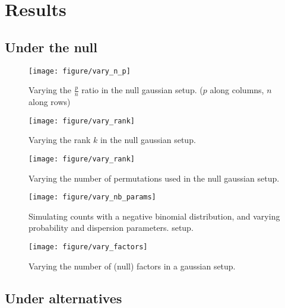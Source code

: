 \documentclass{article}
\begin{document}
\section{Results}

\subsection{Under the null}

\begin{figure}[ht]
  \centering
  \texttt{[image: figure/vary\_n\_p]}
  \caption{Varying the $\frac{p}{n}$ ratio in the null gaussian
    setup. ($p$ along columns, $n$ along rows)\label{fig:label} }
\end{figure}

\begin{figure}[ht]
  \centering
  \texttt{[image: figure/vary\_rank]}
  \caption{Varying the rank $k$ in the null gaussian setup.\label{fig:label} }
\end{figure}

\begin{figure}[ht]
  \centering
  \texttt{[image: figure/vary\_rank]}
  \caption{Varying the number of permutations used in the null gaussian
    setup.\label{fig:label} }
\end{figure}

\begin{figure}[ht]
  \centering
  \texttt{[image: figure/vary\_nb\_params]}
  \caption{Simulating counts with a negative binomial distribution, and varying
    probability and dispersion parameters.
    setup.\label{fig:label}}
\end{figure}

\begin{figure}[ht]
  \centering
  \texttt{[image: figure/vary\_factors]}
  \caption{Varying the number of (null) factors in a gaussian
    setup. \label{fig:label}}
\end{figure}

\subsection{Under alternatives}



\end{document}
